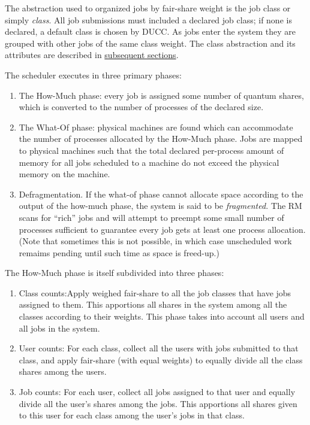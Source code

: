     The abstraction used to organized jobs by fair-share weight is the
    job class or simply {\em class}.  All job submissions must included a declared job class; if none
    is declared, a default class is chosen by DUCC.  As jobs enter the system they are
    grouped with other jobs of the same class weight. The class abstraction
    and its attributes are described in \hyperref[sec:rm.job-classes]{subsequent sections}.
    
    The scheduler executes in three primary phases: 
    \begin{enumerate}

        \item The How-Much phase: every job is assigned some number of
          quantum shares, which is converted to the number of
          processes of the declared size.

        \item The What-Of phase: physical machines are found which can
          accommodate the number of processes allocated by the
          How-Much phase. Jobs are mapped to physical machines such
          that the total declared per-process amount of memory for all
          jobs scheduled to a machine do not exceed the physical
          memory on the machine.

        \item Defragmentation. If the what-of phase cannot allocate
          space according to the output of the how-much phase, the
          system is said to be {\em fragmented.}  The RM scans for
          ``rich'' jobs and will attempt to preempt some small number
          of processes sufficient to guarantee every job gets at least
          one process allocation. (Note that sometimes this is not possible,
          in which case unscheduled work remaims pending until such
          time as space is freed-up.)

    \end{enumerate}
      
    The How-Much phase is itself subdivided into three phases:
    \begin{enumerate}

        \item Class counts:Apply weighed fair-share to all the job classes that have jobs assigned to
          them. This apportions all shares in the system among all the classes according to their
          weights.  This phase takes into account all users and all jobs in the system.

        \item User counts: For each class, collect all the users with
          jobs submitted to that class, and apply fair-share (with
          equal weights) to equally divide all the class shares among
          the users.
          
        \item Job counts: For each user, collect all jobs
          assigned to that user and equally divide all the user's shares among
          the jobs. This apportions all shares given to this user for each class among the user's
          jobs in that class. 
    \end{enumerate}

